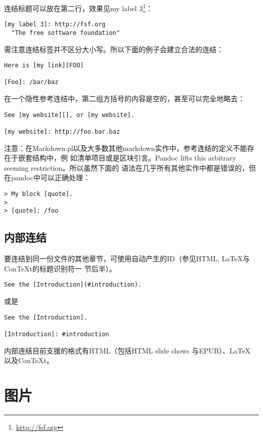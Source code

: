 \documentclass[fancyhdr,bookmark]{ctexbook}
\renewcommand{\href}[2]{#2\footnote{\url{#1}}}
\begin{document}
连结标题可以放在第二行，效果见\href{http://fsf.org}{my label 3}：

\begin{lstlisting}
[my label 3]: http://fsf.org
  "The free software foundation"
\end{lstlisting}

需注意连结标签并不区分大小写。所以下面的例子会建立合法的连结：

\begin{lstlisting}
Here is [my link][FOO]

[Foo]: /bar/baz
\end{lstlisting}

在一个隐性参考连结中，第二组方括号的内容是空的，甚至可以完全地略去：

\begin{lstlisting}
See [my website][], or [my website].

[my website]: http://foo.bar.baz
\end{lstlisting}

注意：在Markdown.pl以及大多数其他markdown实作中，参考连结的定义不能存在于嵌套结构中，例
如清单项目或是区块引言。Pandoc lifts this arbitrary seeming
restriction。所以虽然下面的
语法在几乎所有其他实作中都是错误的，但在pandoc中可以正确处理：

\begin{lstlisting}
> My block [quote].
>
> [quote]: /foo
\end{lstlisting}

\hypertarget{ux5185ux90e8ux8fdeux7ed3}{%
\subsection{内部连结}\label{ux5185ux90e8ux8fdeux7ed3}}

要连结到同一份文件的其他章节，可使用自动产生的ID（参见HTML,
LaTeX与ConTeXt的标题识别符一 节后半）。

\begin{lstlisting}
See the [Introduction](#introduction).
\end{lstlisting}

或是

\begin{lstlisting}
See the [Introduction].

[Introduction]: #introduction
\end{lstlisting}

内部连结目前支援的格式有HTML（包括HTML slide shows 与EPUB）、LaTeX
以及ConTeXt。

\hypertarget{ux56feux7247}{%
\section{图片}\label{ux56feux7247}}
\end{document}
